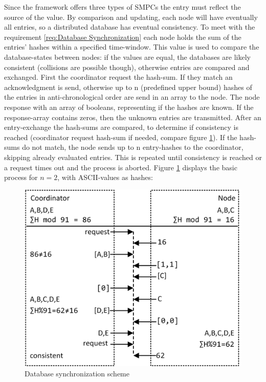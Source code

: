 		Since the framework offers three types of \glspl{SMPC} the entry must reflect the source of the value. By comparison and updating, each node will have eventually all entries, so a distributed database has eventual consistency.
		To meet with the requirement \ref{req:Database Synchronization} each node holds the sum of the entries' hashes within a specified time-window. This value is used to compare the database-states between nodes: if the values are equal, the databases are likely consistent (collisions are possible though), otherwise entries are compared and exchanged. First the coordinator request the hash-sum. If they match an acknowledgment is send, otherwise up to n (predefined upper bound) hashes of the entries in anti-chronological order are send in an array to the node. The node response with an array of booleans, representing if the hashes are known. If the response-array contains zeros, then the unknown entries are transmitted. After an entry-exchange the hash-sums are compared, to determine if consistency is reached (coordinator request hash-sum if needed, compare figure \ref{figure:Database synchronization scheme}). If the hash-sums do not match, the node sends up to n entry-hashes to the coordinator, skipping already evaluated entries. This is repeated until consistency is reached or a request times out and the process is aborted.
		Figure \ref{figure:Database synchronization scheme} displays the basic process for $n=2$, with ASCII-values as hashes:
		
		\begin{figure}[!htbp] %
			\caption{Database synchronization scheme} \label{figure:Database synchronization scheme}
			\includegraphics[scale=1.0]{figures/db-synchronization.png}
		\end{figure}
		
